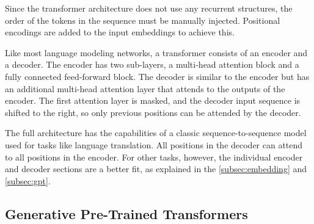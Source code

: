 \documentclass[../main.tex]{subfiles}
\begin{document}
Since the transformer architecture does not use any recurrent structures,
the order of the tokens in the sequence must be manually injected.
Positional encodings are added to the input embeddings to achieve this.

Like most language modeling networks,
a transformer consists of an encoder and a decoder.
The encoder has two sub-layers,
a multi-head attention block
and a fully connected feed-forward block.
The decoder is similar to the encoder
but has an additional multi-head attention layer
that attends to the outputs of the encoder.
The first attention layer is masked,
and the decoder input sequence is shifted to the right,
so only previous positions can be
attended by the decoder.

The full architecture has the capabilities of a classic sequence-to-sequence model
used for tasks like language translation.
All positions in the decoder can attend to all positions in the encoder.
For other tasks, however,
the individual encoder and decoder sections are a better fit,
as explained in the \autoref{subsec:embedding} and \autoref{subsec:gpt}.

\subsection{Generative Pre-Trained Transformers}
\label{subsec:gpt}
\end{document}
